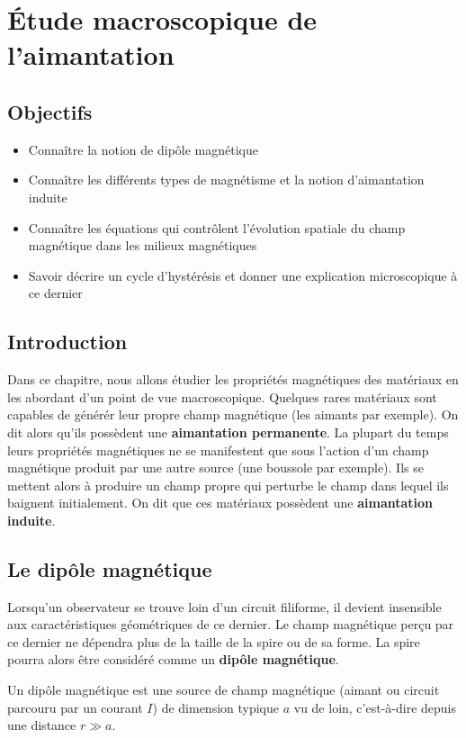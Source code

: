 \chapter{Étude macroscopique de l'aimantation}

\section*{Objectifs}
\begin{itemize}
	\item Connaître la notion de dipôle magnétique
	\item Connaître les différents types de magnétisme et la notion
	  d'aimantation induite
	\item Connaître les équations qui contrôlent l'évolution spatiale
	  du champ magnétique dans les milieux magnétiques
	\item Savoir décrire un cycle d'hystérésis et donner une explication
          microscopique à ce dernier
\end{itemize}
\section*{Introduction}
Dans ce chapitre, nous allons étudier les propriétés magnétiques des matériaux 
en les abordant d'un point de vue macroscopique. Quelques rares matériaux 
sont capables de générér leur propre champ magnétique (les aimants par exemple).
On dit alors qu'ils possèdent une \textbf{aimantation permanente}.
La plupart du temps leurs propriétés magnétiques
ne se manifestent que sous l'action d'un champ magnétique produit par une autre source
(une boussole par exemple). Ils se mettent alors à produire un champ propre qui
perturbe le champ dans lequel ils baignent initialement. 
On dit que ces matériaux possèdent une \textbf{aimantation
induite}.
\section{Le dipôle magnétique}
	Lorsqu'un observateur se trouve loin d'un circuit filiforme, il devient insensible
	aux caractéristiques géométriques de ce dernier. Le champ magnétique perçu par ce 
	dernier ne dépendra plus de la taille de la spire ou de sa forme. La spire 
	pourra alors être considéré comme un \textbf{dipôle magnétique}.

	\begin{defn}
		Un dipôle magnétique est une source de champ magnétique (aimant 
		ou circuit parcouru par un courant $I$) de dimension typique $a$
		vu de loin, c'est-à-dire depuis une distance $r \gg a$.
	\end{defn}

